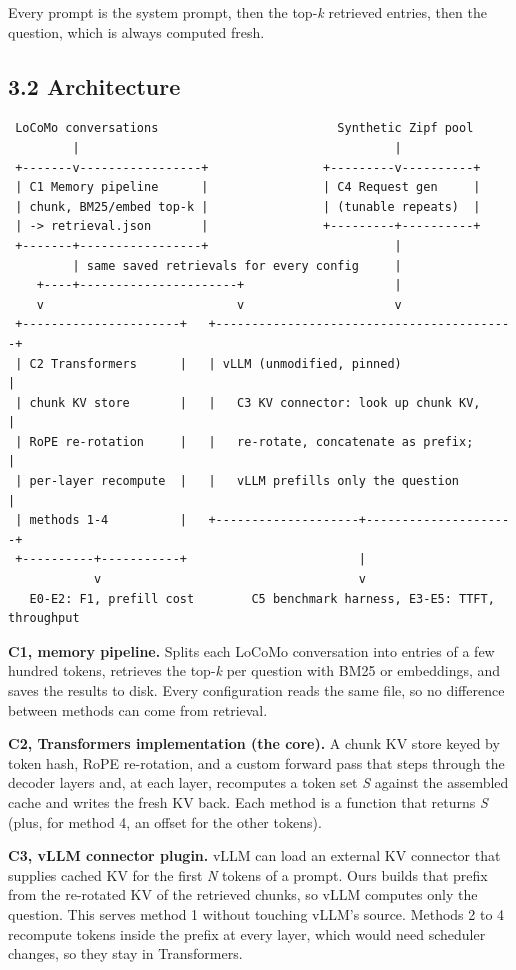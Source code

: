 \documentclass[
  10pt,
]{article}
\begin{document}
Every prompt is the system prompt, then the top-\emph{k} retrieved
entries, then the question, which is always computed fresh.

\subsection{3.2 Architecture}\label{architecture}

\begin{verbatim}
 LoCoMo conversations                         Synthetic Zipf pool
         |                                            |
 +-------v-----------------+                +---------v----------+
 | C1 Memory pipeline      |                | C4 Request gen     |
 | chunk, BM25/embed top-k |                | (tunable repeats)  |
 | -> retrieval.json       |                +---------+----------+
 +-------+-----------------+                          |
         | same saved retrievals for every config     |
    +----+----------------------+                     |
    v                           v                     v
 +----------------------+   +------------------------------------------+
 | C2 Transformers      |   | vLLM (unmodified, pinned)                |
 | chunk KV store       |   |   C3 KV connector: look up chunk KV,     |
 | RoPE re-rotation     |   |   re-rotate, concatenate as prefix;      |
 | per-layer recompute  |   |   vLLM prefills only the question        |
 | methods 1-4          |   +--------------------+---------------------+
 +----------+-----------+                        |
            v                                    v
   E0-E2: F1, prefill cost        C5 benchmark harness, E3-E5: TTFT, throughput
\end{verbatim}

\textbf{C1, memory pipeline.} Splits each LoCoMo conversation into
entries of a few hundred tokens, retrieves the top-\emph{k} per question
with BM25 or embeddings, and saves the results to disk. Every
configuration reads the same file, so no difference between methods can
come from retrieval.

\textbf{C2, Transformers implementation (the core).} A chunk KV store
keyed by token hash, RoPE re-rotation, and a custom forward pass that
steps through the decoder layers and, at each layer, recomputes a token
set \emph{S} against the assembled cache and writes the fresh KV back.
Each method is a function that returns \emph{S} (plus, for method 4, an
offset for the other tokens).

\textbf{C3, vLLM connector plugin.} vLLM can load an external KV
connector that supplies cached KV for the first \emph{N} tokens of a
prompt. Ours builds that prefix from the re-rotated KV of the retrieved
chunks, so vLLM computes only the question. This serves method 1 without
touching vLLM's source. Methods 2 to 4 recompute tokens inside the
prefix at every layer, which would need scheduler changes, so they stay
in Transformers.
\end{document}
